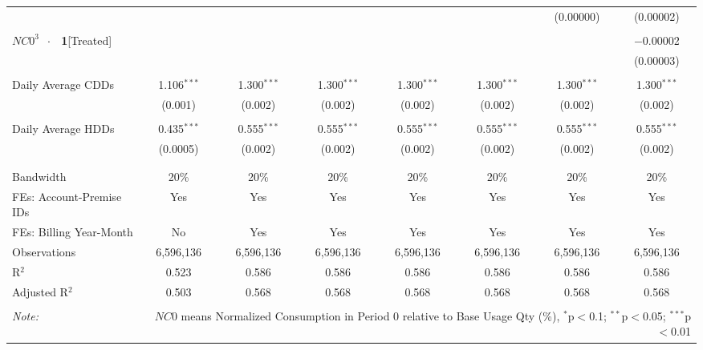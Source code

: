 \begin{table}[!htbp]
\begin{adjustbox}{scale = 0.65}
\begin{tabular}{@{\extracolsep{50pt}}lccccccc}
  &  &  &  &  &  & (0.00000) & (0.00002) \\ 
  & & & & & & & \\ 
 $NC0^{3}$ $\ \cdot \ \ $ \textbf{1}[Treated] &  &  &  &  &  &  & $-$0.00002 \\ 
  &  &  &  &  &  &  & (0.00003) \\ 
  & & & & & & & \\ 
 Daily Average CDDs & 1.106$^{***}$ & 1.300$^{***}$ & 1.300$^{***}$ & 1.300$^{***}$ & 1.300$^{***}$ & 1.300$^{***}$ & 1.300$^{***}$ \\ 
  & (0.001) & (0.002) & (0.002) & (0.002) & (0.002) & (0.002) & (0.002) \\ 
  & & & & & & & \\ 
 Daily Average HDDs & 0.435$^{***}$ & 0.555$^{***}$ & 0.555$^{***}$ & 0.555$^{***}$ & 0.555$^{***}$ & 0.555$^{***}$ & 0.555$^{***}$ \\ 
  & (0.0005) & (0.002) & (0.002) & (0.002) & (0.002) & (0.002) & (0.002) \\ 
  & & & & & & & \\ 
\hline \\[-1.8ex] 
Bandwidth & 20\% & 20\% & 20\% & 20\% & 20\% & 20\% & 20\% \\ 
FEs: Account-Premise IDs & Yes & Yes & Yes & Yes & Yes & Yes & Yes \\ 
FEs: Billing Year-Month & No & Yes & Yes & Yes & Yes & Yes & Yes \\ 
Observations & 6,596,136 & 6,596,136 & 6,596,136 & 6,596,136 & 6,596,136 & 6,596,136 & 6,596,136 \\ 
R$^{2}$ & 0.523 & 0.586 & 0.586 & 0.586 & 0.586 & 0.586 & 0.586 \\ 
Adjusted R$^{2}$ & 0.503 & 0.568 & 0.568 & 0.568 & 0.568 & 0.568 & 0.568 \\ 
\hline 
\hline \\[-1.8ex] 
\textit{Note:}  & \multicolumn{7}{r}{$NC0$ means Normalized Consumption in Period 0 relative to Base Usage Qty (\%), $^{*}$p$<$0.1; $^{**}$p$<$0.05; $^{***}$p$<$0.01} \\ 
\end{tabular}
\end{adjustbox}
\end{table} 
